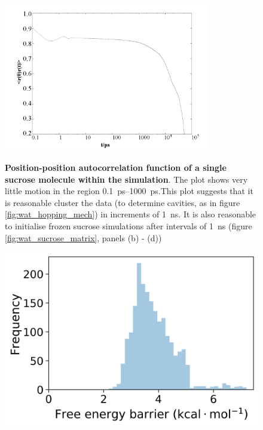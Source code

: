 \begin{figure}
    \centering
    \caption{\textbf{Position-position autocorrelation function of a single sucrose molecule within the simulation}. The plot shows very little motion in the region \SIrange{0.1}{1000}{\pico\second}.This plot suggests that it is reasonable cluster the data (to determine cavities, as in figure \ref{fig:wat_hopping_mech}) in increments of \SI{1}{\nano\second}. It is also reasonable to initialise frozen sucrose simulations after intervals of \SI{1}{\nano\second} (figure \ref{fig:wat_sucrose_matrix}, panels (b) - (d))}
    \includegraphics[width=0.8\textwidth]{chapters/water_hopping/figures/Fig_S8.png}
    \label{fig:wat_pos_pos_auto}
\end{figure}

\begin{figure}
    \centering
    \includegraphics{chapters/water_hopping/figures/Fig_S10.png}
    \label{fig:wat_free_energy_dist}
\end{figure}

